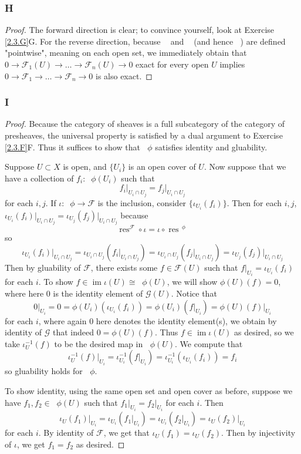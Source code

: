 \documentclass{article}
\newcommand{\fF}{\mathscr{F}}
\newcommand{\fG}{\mathscr{G}}
\DeclareMathOperator{\res}{res}
\DeclareMathOperator{\im}{im}
\DeclareMathOperator{\cok}{cok}
\DeclareMathOperator{\kerpre}{\ker_{\text{pre}}}
\DeclareMathOperator{\cokpre}{\cok_{\text{pre}}}
\DeclareMathOperator{\impre}{\im_{\text{pre}}}
\begin{document}
\subsubsection{H}\label{2.3.H}
\begin{proof}
    The forward direction is clear; to convince yourself, look at Exercise \ref{2.3.G}G. For the reverse direction, because $\kerpre$ and $\cokpre$ (and hence $\impre$) are defined "pointwise", meaning on each open set, we immediately obtain that $0 \to \fF_1(U) \to \dots \to \fF_n(U) \to 0$ exact for every open $U$ implies $0\to \fF_1 \to \dots\to \fF_n \to 0$ is also exact.
\end{proof}
\subsubsection{I}\label{2.3.I}
\begin{proof}
    Because the category of sheaves is a full subcategory of the category of presheaves, the universal property is satisfied by a dual argument to Exercise \ref{2.3.F}F. Thus it suffices to show that $\kerpre \phi$  satisfies identity and gluability.

    Suppose $U\subset X$ is open, and $\{U_i\}$ is an open cover of $U$. Now suppose that we have a collection of $f_i:\kerpre \phi(U_i)$ such that
    \[
    f_i\vert_{U_i\cap U_j}=f_j\vert_{U_i\cap U_j}
    \]
    for each $i,j$. If $\iota:\kerpre \phi\to \fF$ is the inclusion, consider $\{\iota_{U_i}(f_i)\}$. Then for each $i,j$, $\iota_{U_i}(f_i)\vert_{U_i\cap U_j}=\iota_{U_j}(f_j)\vert_{U_i\cap U_j}$ because
    \[
    \res^{\fF} \circ \iota =\iota \circ \res^{\kerpre \phi}
    \]
    so 
    \[
    \iota_{U_i}(f_i)\vert_{U_i\cap U_j}=\iota_{U_i\cap U_j}(f_i\vert_{U_i\cap U_j})=\iota_{U_i\cap U_j}(f_j\vert_{U_i\cap U_j})=\iota_{U_j}(f_j)\vert_{U_i\cap U_j}
    \]
    Then by gluability of $\fF$, there exists some $f\in \fF(U)$ such that $f\vert_{U_i}=\iota_{U_i}(f_i)$ for each $i$. To show $f\in \im \iota(U) \cong \kerpre\phi(U)$, we will show $\phi(U)(f)=0$, where here $0$ is the identity element of $\fG(U)$. Notice that
    \[
    0\vert_{U_i}=0=\phi(U_i)(\iota_{U_i}(f_i))=\phi(U_i)(f\vert_{U_i})=\phi(U)(f)\vert_{U_i}
    \]
    for each $i$, where again $0$ here denotes the identity element(s), we obtain by identity of $\fG$ that indeed $0=\phi(U)(f)$. Thus $f\in \im \iota(U)$ as desired, so we take $\iota^{-1}_U(f)$ to be the desired map in $\kerpre\phi(U)$. We compute that
    \[
    \iota^{-1}_U(f)\vert_{U_i}=\iota^{-1}_{U_i}(f\vert_{U_i})=\iota^{-1}_{U_i}(\iota_{U_i}(f_i))=f_i
    \]
    so gluability holds for $\kerpre\phi$.

    To show identity, using the same open set and open cover as before, suppose we have $f_1,f_2\in \kerpre\phi(U)$ such that $f_1\vert_{U_i}=f_2\vert_{U_i}$ for each $i$. Then \[
    \iota_U(f_1)\vert_{U_i}=\iota_{U_i}(f_1\vert_{U_i})=\iota_{U_i}(f_2\vert_{U_i})=\iota_U(f_2)\vert_{U_i}
    \]
    for each $i$. By identity of $\fF$, we get that $\iota_U(f_1)=\iota_U(f_2)$. Then by injectivity of $\iota$, we get $f_1=f_2$ as desired.
\end{proof}
\end{document}
